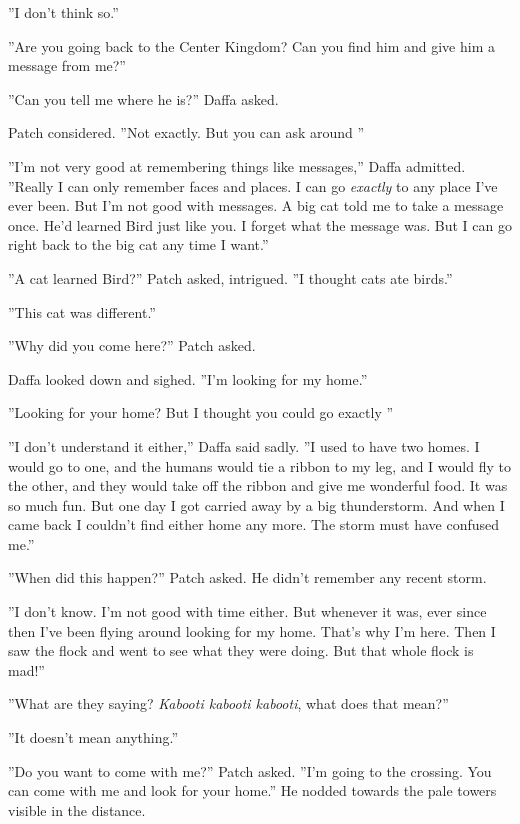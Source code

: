 \documentclass[11pt]{article}
\begin{document}
 ''I don't think so.''\par
 ''Are you going back to the Center Kingdom? Can you find him and give him a message from me?''\par
 ''Can you tell me where he is?'' Daffa asked.\par
 Patch considered. ''Not exactly. But you can ask around%
''\par
 ''I'm not very good at remembering things like messages,'' Daffa admitted. ''Really I can only remember faces and places. I can go {\it exactly} to any place I've ever been. But I'm not good with messages. A big cat told me to take a message once. He'd learned Bird just like you. I forget what the message was. But I can go right back to the big cat any time I want.''\par
 ''A cat learned Bird?'' Patch asked, intrigued. ''I thought cats ate birds.''\par
 ''This cat was different.''\par
 ''Why did you come here?'' Patch asked.\par
 Daffa looked down and sighed. ''I'm looking for my home.''\par
 ''Looking for your home? But I thought you could go exactly %
''\par
 ''I don't understand it either,'' Daffa said sadly. ''I used to have two homes. I would go to one, and the humans would tie a ribbon to my leg, and I would fly to the other, and they would take off the ribbon and give me wonderful food. It was so much fun. But one day I got carried away by a big thunderstorm. And when I came back I couldn't find either home any more. The storm must have confused me.''\par
 ''When did this happen?'' Patch asked. He didn't remember any recent storm.\par
 ''I don't know. I'm not good with time either. But whenever it was, ever since then I've been flying around looking for my home. That's why I'm here. Then I saw the flock and went to see what they were doing. But that whole flock is mad!''\par
 ''What are they saying? {\it Kabooti kabooti kabooti}, what does that mean?''\par
 ''It doesn't mean anything.''\par
 ''Do you want to come with me?'' Patch asked. ''I'm going to the crossing. You can come with me and look for your home.'' He nodded towards the pale towers visible in the distance.\par
\end{document}
